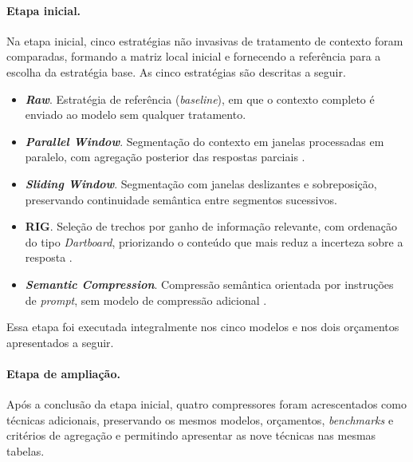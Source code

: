\paragraph{Etapa inicial.}
Na etapa inicial, cinco estratégias não invasivas de tratamento de contexto foram comparadas, formando a matriz local inicial e fornecendo a referência para a escolha da estratégia base. As cinco estratégias são descritas a seguir.

\begin{itemize}[leftmargin=1.6em]
\item \textbf{\textit{Raw}}. Estratégia de referência (\textit{baseline}), em que o contexto completo é enviado ao modelo sem qualquer tratamento.

\item \textbf{\textit{Parallel Window}}. Segmentação do contexto em janelas processadas em paralelo, com agregação posterior das respostas parciais \cite{ratner2023parallelwindows}.

\item \textbf{\textit{Sliding Window}}. Segmentação com janelas deslizantes e sobreposição, preservando continuidade semântica entre segmentos sucessivos.

\item \textbf{RIG}. Seleção de trechos por ganho de informação relevante, com ordenação do tipo \textit{Dartboard}, priorizando o conteúdo que mais reduz a incerteza sobre a resposta \cite{pickett2024rig}.

\item \textbf{\textit{Semantic Compression}}. Compressão semântica orientada por instruções de \textit{prompt}, sem modelo de compressão adicional \cite{gilbert2023semanticcompression}.
\end{itemize}

Essa etapa foi executada integralmente nos cinco modelos e nos dois orçamentos apresentados a seguir.

\paragraph{Etapa de ampliação.}
Após a conclusão da etapa inicial, quatro compressores foram acrescentados como técnicas adicionais, preservando os mesmos modelos, orçamentos, \textit{benchmarks} e critérios de agregação e permitindo apresentar as nove técnicas nas mesmas tabelas.


